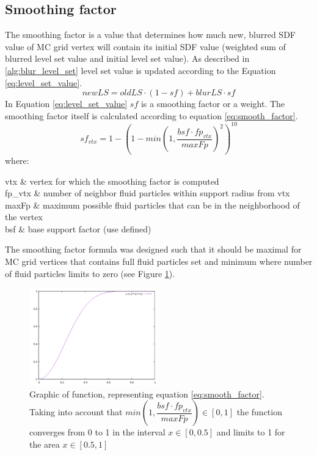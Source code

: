 \subsection{Smoothing factor}
The smoothing factor is a value that determines how much new, blurred SDF value of MC grid vertex will contain its initial SDF value (weighted sum of blurred level set value and initial level set value). As described in \ref{alg:blur_level_set} level set value is updated according to the Equation \ref{eq:level_set_value}.
\begin{equation}
newLS = oldLS \cdot (1 - sf) + blurLS \cdot sf \label{eq:level_set_value}
\end{equation}
In Equation \ref{eq:level_set_value} $sf$ is a smoothing factor or a weight. The smoothing factor itself is calculated according to equation \ref{eq:smooth_factor}.
\begin{equation}
	sf_{vtx} = 1 - (1 - min(1, \dfrac{bsf \cdot fp_{vtx}}{maxFp})^2)^{10} \label{eq:smooth_factor}
\end{equation}
where:
\begin{conditions}
	vtx & vertex for which the smoothing factor is computed\\
	fp_{vtx} & number of neighbor fluid particles within support radius from vtx\\
	maxFp & maximum possible fluid particles that can be in the neighborhood of the vertex \\
	bsf & base support factor (use defined)
\end{conditions}
The smoothing factor formula was designed such that it should be maximal for MC grid vertices that contains full fluid particles set and minimum where number of fluid particles limits to zero (see Figure \ref{fig:sf_function_graph}).
\begin{figure}[H]
	\begin{center}
			\includegraphics[width=0.5\textwidth]{figures/sf_function_graph.png}		
	\end{center}
	\caption{Graphic of function, representing equation \ref{eq:smooth_factor}. Taking into account that $min(1, \dfrac{bsf \cdot fp_{vtx}}{maxFp}) \in [0,1]$ the function converges from 0 to 1 in the interval $x \in [0, 0.5]$ and limits to 1 for the area $x\in [0.5, 1]$}
	\label{fig:sf_function_graph}
\end{figure}

